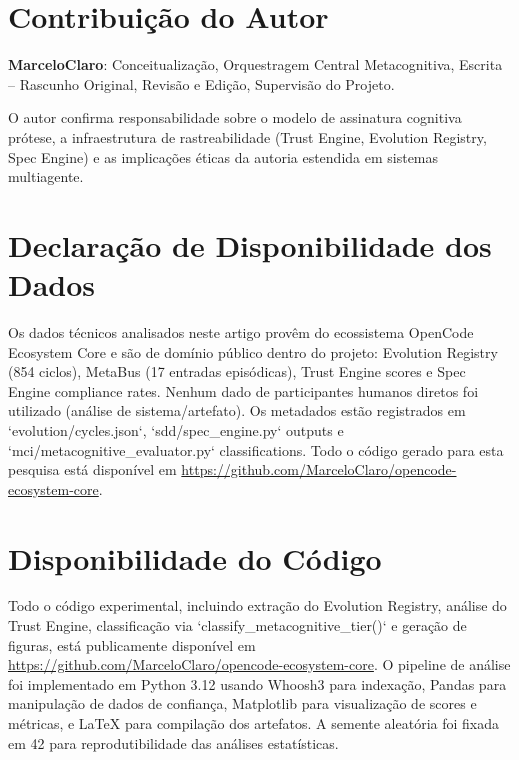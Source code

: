 \documentclass[12pt,a4paper]{article}
\begin{document}

\clearpage
\section*{Contribuição do Autor}

\textbf{MarceloClaro}: Conceitualização, Orquestragem Central Metacognitiva, Escrita -- Rascunho Original, Revisão e Edição, Supervisão do Projeto.

O autor confirma responsabilidade sobre o modelo de assinatura cognitiva prótese, a infraestrutura de rastreabilidade (Trust Engine, Evolution Registry, Spec Engine) e as implicações éticas da autoria estendida em sistemas multiagente.

\section*{Declaração de Disponibilidade dos Dados}

Os dados técnicos analisados neste artigo provêm do ecossistema OpenCode Ecosystem Core e são de domínio público dentro do projeto: Evolution Registry (854 ciclos), MetaBus (17 entradas episódicas), Trust Engine scores e Spec Engine compliance rates. Nenhum dado de participantes humanos diretos foi utilizado (análise de sistema/artefato). Os metadados estão registrados em `evolution/cycles.json`, `sdd/spec_engine.py` outputs e `mci/metacognitive_evaluator.py` classifications. Todo o código gerado para esta pesquisa está disponível em \url{https://github.com/MarceloClaro/opencode-ecosystem-core}.

\section*{Disponibilidade do Código}

Todo o código experimental, incluindo extração do Evolution Registry, análise do Trust Engine, classificação via `classify_metacognitive_tier()` e geração de figuras, está publicamente disponível em \url{https://github.com/MarceloClaro/opencode-ecosystem-core}. O pipeline de análise foi implementado em Python 3.12 usando Whoosh3 para indexação, Pandas para manipulação de dados de confiança, Matplotlib para visualização de scores e métricas, e LaTeX para compilação dos artefatos. A semente aleatória foi fixada em 42 para reprodutibilidade das análises estatísticas.
\end{document}
